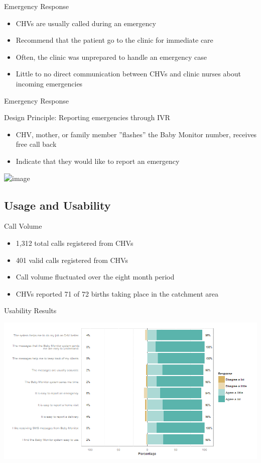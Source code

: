 \documentclass[xcolor=x11names,compress]{beamer}
\renewcommand{\(}{\begin{columns}}
\renewcommand{\)}{\end{columns}}
\newcommand{\<}[1]{\begin{column}{#1}}
\renewcommand{\>}{\end{column}}
\begin{document}
\begin{frame}[t]{Emergency Response}
\begin{itemize}
\item{CHVs are usually called during an emergency}
\item{Recommend that the patient go to the clinic for immediate care}
\item{Often, the clinic was unprepared to handle an emergency case}
\item{Little to no direct communication between CHVs and clinic nurses about incoming emergencies}
\end{itemize}
\end{frame}

\begin{frame}[t]{Emergency Response}
\begin{block}{\textcolor{IndianRed2}{Design Principle: Reporting emergencies through IVR}}
\begin{itemize}
\item{CHV, mother, or family member ''flashes'' the Baby Monitor number, receives free call back}
\item{Indicate that they would like to report an emergency}
\end{itemize}
\centerline{\includegraphics<1>[scale=0.25]{reportem1}}
\end{block}
\end{frame}


\subsection{Usage and Usability}
\begin{frame}{Call Volume}
\begin{itemize}
\item{1,312 total calls registered from CHVs}
\item{401 valid calls registered from CHVs}
\item{Call volume fluctuated over the eight month period}
\item{CHVs reported 71 of 72 births taking place in the catchment area}
\end{itemize}
\end{frame}

\begin{frame}{Usability Results}
\centerline{\includegraphics[scale=0.42]{usability}}
\end{frame}
\end{document}
